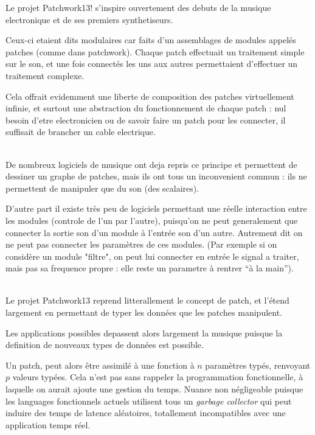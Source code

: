 \documentclass[14pt,a4paper]{article}
\begin{document}
\par
Le projet Patchwork13! s'inspire ouvertement des debuts de la
 musique electronique et de ses premiers synthetiseurs.
\\
\par
Ceux-ci etaient dits modulaires car faits d'un assemblages de
 modules appel\'es patches (comme dans patchwork).
 Chaque patch effectuait un traitement simple sur le son,
 et une fois connect\'es les uns aux autres permettaient
 d'effectuer un traitement complexe.
\\
\par
Cela offrait evidemment une liberte de composition des patches
 virtuellement infinie, et surtout une abstraction du fonctionnement
 de chaque patch : nul besoin d'etre electronicien ou de savoir faire
 un patch pour les connecter, il suffisait de brancher un cable electrique.
\\
\\
\par
De nombreux logiciels de musique ont deja repris ce principe et
 permettent de dessiner un graphe de patches, mais ils ont tous un
 inconvenient commun : ils ne permettent de manipuler que du son
 (des scalaires).
\\
\par
D'autre part il existe tr\`es peu de logiciels permettant une
 r\'eelle interaction entre les modules (controle de l'un par l'autre),
 puisqu'on ne peut generalement que connecter la sortie son d'un module
 \`a l'entr\'ee son d'un autre. Autrement dit on ne peut pas connecter
 les param\`etres de ces modules.
(Par exemple si on consid\`ere un module "filtre", on peut lui connecter en entr\'ee le signal a traiter, mais pas sa frequence propre : elle reste un
 parametre \`a rentrer ``\`a la main'').
\\
\\
\par
Le projet Patchwork13 reprend litterallement le concept de patch,
 et l'\'etend largement en permettant de typer les donn\'ees que
 les patches manipulent.
\\
\par
Les applications possibles depassent alors largement la musique
 puisque la definition de nouveaux types de donn\'ees est possible.
\\
\par
Un patch, peut alors \^etre assimil\'e \`a une fonction \`a $n$
 param\`etres typ\'es, renvoyant $p$ valeurs typ\'ees.
 Cela n'est pas sans rappeler la programmation fonctionnelle,
 \`a laquelle on aurait ajoute une gestion du temps.
Nuance non n\'egligeable puisque les languages fonctionnels actuels
 utilisent tous un \textsl{garbage collector} qui peut induire des
 temps de latence al\'eatoires, totallement incompatibles avec une
 application temps r\'eel.
\end{document}

